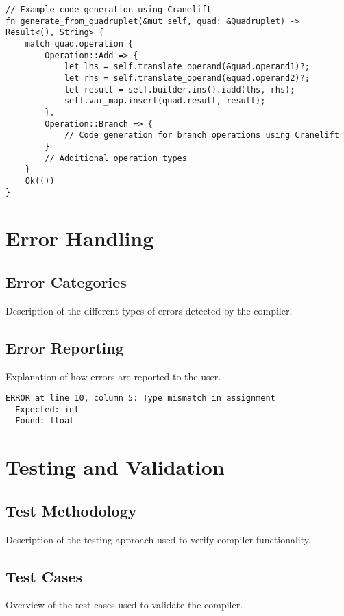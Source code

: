 \documentclass[12pt,a4paper]{article}
\begin{document}
\begin{lstlisting}[caption={Code Generation Example}]
// Example code generation using Cranelift
fn generate_from_quadruplet(&mut self, quad: &Quadruplet) -> Result<(), String> {
    match quad.operation {
        Operation::Add => {
            let lhs = self.translate_operand(&quad.operand1)?;
            let rhs = self.translate_operand(&quad.operand2)?;
            let result = self.builder.ins().iadd(lhs, rhs);
            self.var_map.insert(quad.result, result);
        },
        Operation::Branch => {
            // Code generation for branch operations using Cranelift
        }
        // Additional operation types
    }
    Ok(())
}
\end{lstlisting}

\section{Error Handling}
\subsection{Error Categories}
Description of the different types of errors detected by the compiler.

\subsection{Error Reporting}
Explanation of how errors are reported to the user.

\begin{lstlisting}[caption={Example Compiler Error Output}]
ERROR at line 10, column 5: Type mismatch in assignment
  Expected: int
  Found: float
\end{lstlisting}

\section{Testing and Validation}
\subsection{Test Methodology}
Description of the testing approach used to verify compiler functionality.

\subsection{Test Cases}
Overview of the test cases used to validate the compiler.
\end{document}
